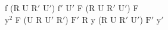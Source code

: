 f (R U $\text{R}'$ $\text{U}'$) $\text{f}'$ $\text{U}'$ F (R U $\text{R}'$ $\text{U}'$) F\\
$\text{y}^2$ F (U R $\text{U}'$ $\text{R}'$) $\text{F}'$ R y (R U $\text{R}'$ $\text{U}'$) $\text{F}'$ $\text{y}'$\\
